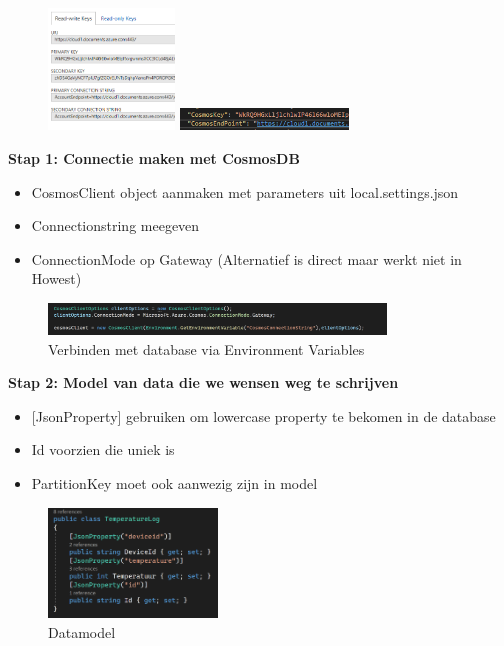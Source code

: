 \documentclass{article}
\newcommand{\bold}[1]{\textbf{#1}}
\begin{document}
\begin{figure}[H]
    \centering
    \includegraphics[width=0.3\textwidth]{cosmosdb-parameters.png}
    \includegraphics[width=0.4\textwidth]{cosmosdb-localjson.png}
    \caption{}
\end{figure}

\bold{Stap 1: Connectie maken met CosmosDB}

\begin{itemize}
    \item CosmosClient object aanmaken met parameters uit local.settings.json
    \item Connectionstring meegeven
    \item ConnectionMode op Gateway (Alternatief is direct maar werkt niet in Howest)
\end{itemize}

\begin{figure}[H]
    \centering
    \includegraphics[width=0.8\textwidth]{cosmosdb-stap1.png}
    \caption{Verbinden met database via Environment Variables}
\end{figure}


\bold{Stap 2: Model van data die we wensen weg te schrijven}

\begin{itemize}
    \item {[JsonProperty]} gebruiken om lowercase property te bekomen in de database
    \item Id voorzien die uniek is
    \item PartitionKey moet ook aanwezig zijn in model
\end{itemize}

\begin{figure}[H]
    \centering
    \includegraphics[width=0.4\textwidth]{cosmosdb-stap2.png}
    \caption{Datamodel}
\end{figure}
\end{document}

